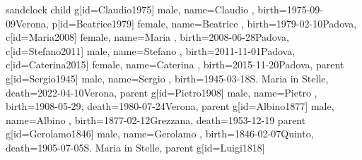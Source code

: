 \documentclass{article}
\begin{document}
\begin{midpage}
\begin{center}

\begin{genealogypicture}[
    processing=database,
    database format=full,
    timeflow=right,
    node size=1.7cm,
    level size=3.5cm,
    level distance=6mm,
    list separators hang=3mm,
    name font=\bfseries,
    surn code={\textcolor{black!50!black}{#1}},
    place text={\newline}{},
    date format=d month yyyy,
    tcbset={male/.style={colframe=blue,colback=blue!5},
    female/.style={colframe=red,colback=red!5}},
    box={fit basedim=7pt,boxsep=2pt,segmentation style=solid,
        halign=left,before upper=\parskip1pt,
        \gtrDBsex,
    },
    add parent=Clementina1865 to salv_fam,
]
sandclock
{
    child{
        g[id=Claudio1975]{
            male,
            name={Claudio },
            birth={1975-09-09}{Verona},
        }
        p[id=Beatrice1979]{
            female,
            name={Beatrice },
            birth={1979-02-10}{Padova},
        }
        c[id=Maria2008]{
            female,
            name={Maria },
            birth={2008-06-28}{Padova},
        }
        c[id=Stefano2011]{
            male,
            name={Stefano },
            birth={2011-11-01}{Padova},
        }
        c[id=Caterina2015]{
            female,
            name={Caterina },
            birth={2015-11-20}{Padova},
        }
    }
    parent{
        g[id=Sergio1945]{
            male,
            name={Sergio },
            birth={1945-03-18}{S. Maria in Stelle},
            death={2022-04-10}{Verona},
        }
        parent{
            g[id=Pietro1908]{
                male,
                name={Pietro },
                birth={1908-05-29}{},
                death={1980-07-24}{Verona},
            }
            parent{
                g[id=Albino1877]{
                    male,
                    name={Albino },
                    birth={1877-02-12}{Grezzana},
                    death={1953-12-19}{}
                }
                parent{
                    g[id=Gerolamo1846]{
                        male,
                        name={Gerolamo },
                        birth={1846-02-07}{Quinto},
                        death={1905-07-05}{S. Maria in Stelle},
                    }
                    parent{
                        g[id=Luigi1818]{
}}}}}}}
\end{genealogypicture}
\end{center}
\end{midpage}
\end{document}
